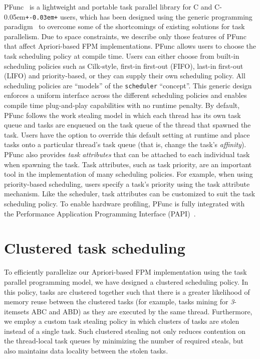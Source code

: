 \documentclass{IOS-Book-Article}
\newcommand{\Cpp}{C\kern-0.05em\texttt{+\kern-0.03em+}}
\newcommand{\code}[1]{\lstinline[basicstyle=\sffamily]{#1}}
\begin{document}
PFunc~\cite{kambadur09:pfunc} is a lightweight and portable task parallel
library for C and \Cpp{} users, which has been designed using the generic
programming paradigm~\cite{garcia05:_extended_comparing05} to overcome some of
the shortcomings of existing solutions for task parallelism.  Due to space
constraints, we describe only those features of PFunc that affect Apriori-based
FPM implementations.
PFunc allows users to choose the task scheduling policy at compile time. Users
can either choose from built-in scheduling policies such as Cilk-style,
first-in first-out (FIFO), last-in first-out (LIFO) and priority-based, or
they can supply their own scheduling policy. All scheduling policies are
``models'' of the \code{scheduler} ``concept''. This generic design enforces a
uniform interface across the different scheduling policies and enables compile
time plug-and-play capabilities with no runtime penalty.
By default, PFunc follows the work stealing model in which each thread has its
own task queue and tasks are enqueued on the task queue of the thread that
spawned the task.  Users have the option to override this default setting at
runtime and place tasks onto a particular thread's task queue (that is, change
the task's \textit{affinity}).
PFunc also provides \textit{task attributes} that can be attached to each
individual task when spawning the task. Task attributes, such as task
priority, are an important tool in the implementation of many scheduling
policies. For example, when using priority-based scheduling, users specify a
task's priority using the task attribute mechanism. Like the scheduler, task
attributes can be customized to suit the task scheduling policy. 
To enable hardware profiling, PFunc is fully integrated with the Performance
Application Programming Interface (PAPI)~\cite{papi}.

\section{Clustered task scheduling}
\label{sec:cluster}
To efficiently parallelize our Apriori-based FPM implementation using the task
parallel programming model, we have designed a clustered scheduling policy.
In this policy, tasks are clustered together such that there is a greater
likelihood of memory reuse between the clustered tasks (for example, tasks
mining for \textit{3}-itemsets ABC and ABD) as they are executed by the same
thread.  Furthermore, we employ a custom task stealing policy in which clusters
of tasks are stolen instead of a single task.  Such clustered stealing not
only reduces contention on the thread-local task queues by minimizing the
number of required steals, but also maintains data locality between the stolen
tasks.
\end{document}
